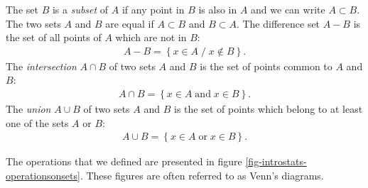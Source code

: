 The set $B$ is a \emph{subset} of $A$ if 
any point in $B$ is also in $A$ and we can write $A\subset B$.
The two sets $A$ and $B$ are equal if $A\subset B$ and $B\subset A$.
The difference set $A-B$ is the set of all points of $A$ which are 
not in $B$:
\begin{eqnarray}
A-B = \left\{x\in A \; / \; x\notin B\right\}.
\end{eqnarray}
The \emph{intersection} $A\cap B$ of two sets $A$ and $B$ is the set of 
points common to $A$ and $B$:
\begin{eqnarray}
A\cap B = \left\{x\in A \; \textrm{and}\; x\in B\right\}.
\end{eqnarray}
The \emph{union} $A\cup B$ of two sets $A$ and $B$
is the set of points which belong to at least one of the sets 
$A$ or $B$:
\begin{eqnarray}
A\cup B = \left\{x\in A \; \textrm{or}\; x\in B\right\}.
\end{eqnarray}

The operations that we defined are presented in figure 
\ref{fig-introstats-operationsonsets}. These figures are 
often referred to as Venn's diagrams.

